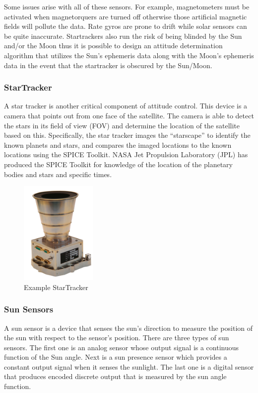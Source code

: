 Some issues arise with all of these sensors. For example,
magnetometers must be activated when magnetorquers are turned off
otherwise those artificial magnetic fields will pollute the data. Rate
gyros are prone to drift while solar sensors can be quite
inaccurate. Startrackers also run the risk of being blinded by the Sun
and/or the Moon thus it is possible to design an
attitude determination algorithm that utilizes the Sun's ephemeris data
along with the Moon's ephemeris data in the event that the startracker
is obscured by the Sun/Moon.

\subsubsection{StarTracker}

A star tracker is another critical component of attitude control. This
device is a camera that points out from one face of the satellite. The
camera is able to detect the stars in its field of view (FOV) and
determine the location of the satellite based on this. Specifically,
the star tracker images the “starscape” to identify the known planets
and stars, and compares the imaged locations to the known locations
using the SPICE Toolkit\cite{qp28}. NASA Jet Propulsion Laboratory (JPL) has
produced the SPICE Toolkit for knowledge of the location of the
planetary bodies and stars and specific times\cite{qp29}.
\begin{figure}[H]
  \begin{center}
  \includegraphics[height=50mm]{Figures/StarTracker}
  \end{center}
  \caption{Example StarTracker \cite{qp30}}
\end{figure}

\subsubsection{Sun Sensors}

A sun sensor is a device that senses the sun’s direction to measure
the position of the sun with respect to the sensor’s position. There
are three types of sun sensors. The first one is an analog sensor
whose output signal is a continuous function of the Sun angle. Next is
a sun presence sensor which provides a constant output signal when it
senses the sunlight. The last one is a digital sensor that produces
encoded discrete output that is measured by the sun angle function.

